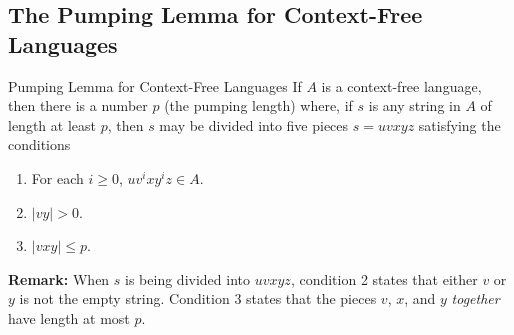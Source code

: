 \documentclass[letterpaper]{article}
\begin{document}
\subsection{The Pumping Lemma for Context-Free Languages}
\begin{theorem}{Pumping Lemma for Context-Free Languages}{}
    If $A$ is a context-free language, then there is a number $p$ (the pumping length) where, if $s$ is any string in $A$ of length at least $p$, then $s$ may be divided into five pieces $s = uvxyz$ satisfying the conditions 
    \begin{enumerate}
        \item For each $i \geq 0$, $uv^i xy^i z \in A$.
        \item $|vy| > 0$.
        \item $|vxy| \leq p$. 
    \end{enumerate}
\end{theorem}
\textbf{Remark:} When $s$ is being divided into $uvxyz$, condition 2 states that either $v$ or $y$ is not the empty string. Condition 3 states that the pieces $v$, $x$, and $y$ \emph{together} have length at most $p$.
\end{document}
